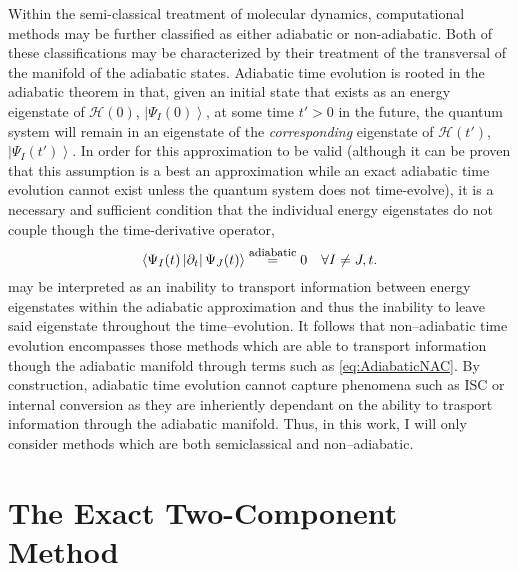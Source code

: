 \documentclass[12pt]{article}
\newcommand{\ket}[1]{\left\vert #1 \right\rangle}         %
\newcommand{\innerop}[3]{\left\langle #1 \left\vert #2 \right\vert #3 \right\rangle}  %
\begin{document}
Within the semi-classical treatment of molecular dynamics, computational methods
may be further classified as either adiabatic or non-adiabatic. Both of these
classifications may be characterized by their treatment of the transversal of
the manifold of the adiabatic states. Adiabatic time evolution is rooted in
the adiabatic theorem in that, given an initial state that exists as an energy
eigenstate of $\mathscr{H}(0)$, $\ket{\Psi_I(0)}$, at some time $t' > 0$ in the
future, the quantum system will remain in an eigenstate of the
\emph{corresponding} eigenstate of $\mathscr{H}(t')$, $\ket{\Psi_I(t')}$. In
order for this approximation to be valid (although it can be proven that this
assumption is a best an approximation while an exact adiabatic time evolution
cannot exist unless the quantum system does not time-evolve), it is a
necessary and sufficient condition that the individual energy eigenstates do
not couple though the time-derivative operator,
\begin{equation}
\innerop{\Psi_I(t)}{\partial_t}{\Psi_J (t)}
  \stackrel{\mathrm{\mbox{\footnotesize adiabatic}}}{=} 0
  \quad \forall I \not = J,t.
  \label{eq:AdiabaticNAC}
\end{equation}
 may be interpreted as an inability to transport
information between energy eigenstates within the adiabatic approximation and
thus the inability to leave said eigenstate throughout the time--evolution.  It
follows that non--adiabatic time evolution encompasses those methods which are
able to transport information though the adiabatic manifold through terms such
as \cref{eq:AdiabaticNAC}. By construction, adiabatic time evolution cannot
capture phenomena such as ISC or internal conversion as they are inheriently
dependant on the ability to trasport information through the adiabatic manifold.
Thus, in this work, I will only consider methods which are both semiclassical
and non--adiabatic.

\section{The Exact Two-Component Method}
\label{sec:X2C}
\end{document}
